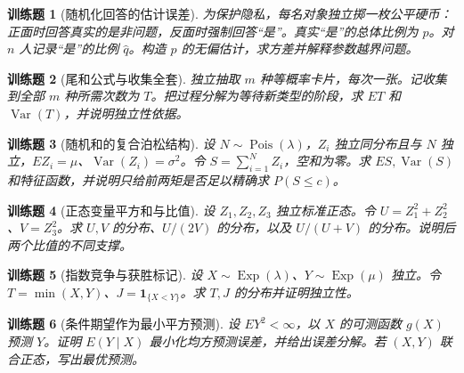 \documentclass[UTF8,12pt,a4paper,fontset=fandol]{ctexbook}
\newtheorem{exercise}{训练题}[section]
\begin{document}
\begin{exercise}[随机化回答的估计误差]\label{q:B17.3}
为保护隐私，每名对象独立掷一枚公平硬币：正面时回答真实的是非问题，反面时强制回答“是”。真实“是”的总体比例为 $p$。对 $n$ 人记录“是”的比例 $\widehat q$。构造 $p$ 的无偏估计，求方差并解释参数越界问题。\par{}\end{exercise}

\begin{exercise}[尾和公式与收集全套]\label{q:B17.4}
独立抽取 $m$ 种等概率卡片，每次一张。记收集到全部 $m$ 种所需次数为 $T$。把过程分解为等待新类型的阶段，求 $ET$ 和 $\operatorname{Var}(T)$，并说明独立性依据。\par{}\end{exercise}

\begin{exercise}[随机和的复合泊松结构]\label{q:B17.5}
设 $N\sim\operatorname{Pois}(\lambda)$，$Z_i$ 独立同分布且与 $N$ 独立，$EZ_i=\mu$、$\operatorname{Var}(Z_i)=\sigma^2$。令 $S=\sum_{i=1}^NZ_i$，空和为零。求 $ES,\operatorname{Var}(S)$ 和特征函数，并说明只给前两矩是否足以精确求 $P(S\le c)$。\par{}\end{exercise}

\begin{exercise}[正态变量平方和与比值]\label{q:B17.6}
设 $Z_1,Z_2,Z_3$ 独立标准正态。令 $U=Z_1^2+Z_2^2$、$V=Z_3^2$。求 $U,V$ 的分布、$U/(2V)$ 的分布，以及 $U/(U+V)$ 的分布。说明后两个比值的不同支撑。\par{}\end{exercise}

\begin{exercise}[指数竞争与获胜标记]\label{q:B17.7}
设 $X\sim\operatorname{Exp}(\lambda)$、$Y\sim\operatorname{Exp}(\mu)$ 独立。令 $T=\min(X,Y)$、$J=\mathbf1_{\{X<Y\}}$。求 $T,J$ 的分布并证明独立性。\par{}\end{exercise}

\begin{exercise}[条件期望作为最小平方预测]\label{q:B17.8}
设 $EY^2<\infty$，以 $X$ 的可测函数 $g(X)$ 预测 $Y$。证明 $E(Y\mid X)$ 最小化均方预测误差，并给出误差分解。若 $(X,Y)$ 联合正态，写出最优预测。\par{}\end{exercise}
\end{document}
